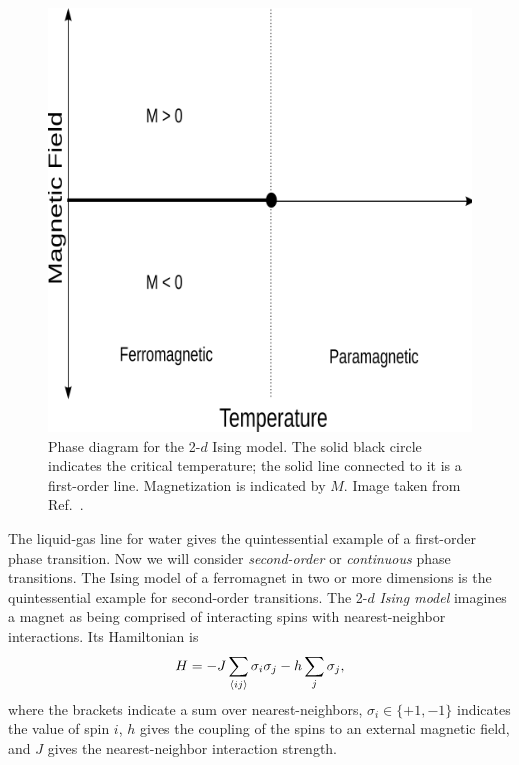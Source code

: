 \begin{figure}
\centering
\includegraphics[width=\linewidth]{figs/ising_phase_diagram.png}
\caption{Phase diagram for the 2-$d$ Ising model. The solid black
circle indicates the critical temperature; the solid line connected to it is a
first-order line. Magnetization is indicated by $M$.
Image taken from Ref.~\cite{ising_picture}.}
\label{fig:phase_ising}
\end{figure}

The liquid-gas line for water 
gives the quintessential example of a first-order phase transition. Now we
will consider {\it second-order} or {\it continuous} phase
transitions. The Ising model of a ferromagnet in two or more
dimensions is the quintessential example for second-order transitions.
The 2-$d$ {\it Ising model} 
imagines a magnet as being comprised of interacting spins
with nearest-neighbor interactions. Its Hamiltonian is
\begin{equation}
H=-J\sum_{\ev{i j}} \sigma_i \sigma_j-h \sum_j
\sigma_j,
\end{equation}
where the brackets indicate a sum over nearest-neighbors,
$\sigma_i\in\{+1,-1\}$ indicates the value of spin $i$, $h$ gives the
coupling of the spins to an external magnetic field, and $J$ gives the
nearest-neighbor interaction strength.

